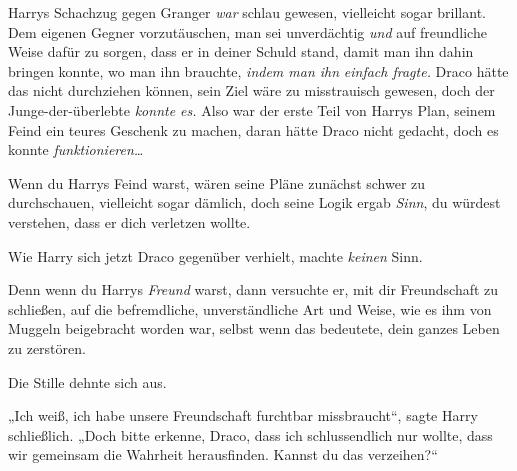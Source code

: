 Harrys Schachzug gegen Granger \emph{war} schlau gewesen, vielleicht sogar brillant. Dem eigenen Gegner vorzutäuschen, man sei unverdächtig \emph{und} auf freundliche Weise dafür zu sorgen, dass er in deiner Schuld stand, damit man ihn dahin bringen konnte, wo man ihn brauchte, \emph{indem man ihn} \emph{einfach fragte.} Draco hätte das nicht durchziehen können, sein Ziel wäre zu misstrauisch gewesen, doch der Junge-der-überlebte \emph{konnte es.} Also war der erste Teil von Harrys Plan, seinem Feind ein teures Geschenk zu machen, daran hätte Draco nicht gedacht, doch es konnte \emph{funktionieren…}

Wenn du Harrys Feind warst, wären seine Pläne zunächst schwer zu durchschauen, vielleicht sogar dämlich, doch seine Logik ergab \emph{Sinn}, du würdest verstehen, dass er dich verletzen wollte.

Wie Harry sich jetzt Draco gegenüber verhielt, machte \emph{keinen} Sinn.

Denn wenn du Harrys \emph{Freund} warst, dann versuchte er, mit dir Freundschaft zu schließen, auf die befremdliche, unverständliche Art und Weise, wie es ihm von Muggeln beigebracht worden war, selbst wenn das bedeutete, dein ganzes Leben zu zerstören.

Die Stille dehnte sich aus.

„Ich weiß, ich habe unsere Freundschaft furchtbar missbraucht“, sagte Harry schließlich. „Doch bitte erkenne, Draco, dass ich schlussendlich nur wollte, dass wir gemeinsam die Wahrheit herausfinden. Kannst du das verzeihen?“

